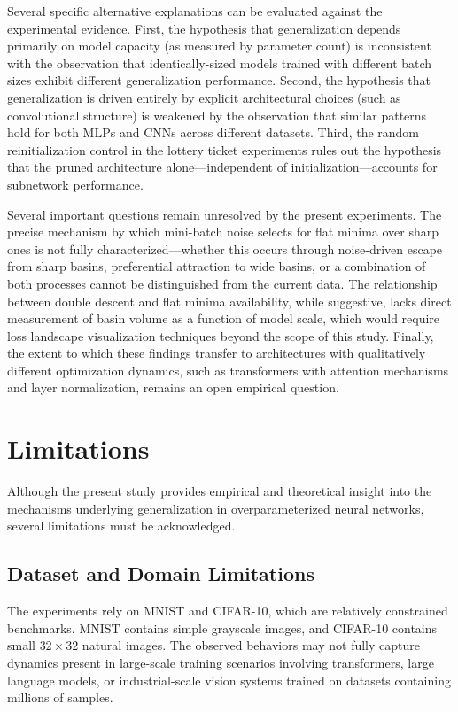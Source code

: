 \documentclass[conference]{IEEEtran}
\begin{document}
Several specific alternative explanations can be evaluated against the experimental evidence. First, the hypothesis that generalization depends primarily on model capacity (as measured by parameter count) is inconsistent with the observation that identically-sized models trained with different batch sizes exhibit different generalization performance. Second, the hypothesis that generalization is driven entirely by explicit architectural choices (such as convolutional structure) is weakened by the observation that similar patterns hold for both MLPs and CNNs across different datasets. Third, the random reinitialization control in the lottery ticket experiments rules out the hypothesis that the pruned architecture alone---independent of initialization---accounts for subnetwork performance.

Several important questions remain unresolved by the present experiments. The precise mechanism by which mini-batch noise selects for flat minima over sharp ones is not fully characterized---whether this occurs through noise-driven escape from sharp basins, preferential attraction to wide basins, or a combination of both processes cannot be distinguished from the current data. The relationship between double descent and flat minima availability, while suggestive, lacks direct measurement of basin volume as a function of model scale, which would require loss landscape visualization techniques beyond the scope of this study. Finally, the extent to which these findings transfer to architectures with qualitatively different optimization dynamics, such as transformers with attention mechanisms and layer normalization, remains an open empirical question.

\section{Limitations}

Although the present study provides empirical and theoretical insight into the mechanisms underlying generalization in overparameterized neural networks, several limitations must be acknowledged.

\subsection{Dataset and Domain Limitations}

The experiments rely on MNIST and CIFAR-10, which are relatively constrained benchmarks. MNIST contains simple grayscale images, and CIFAR-10 contains small $32 \times 32$ natural images. The observed behaviors may not fully capture dynamics present in large-scale training scenarios involving transformers, large language models, or industrial-scale vision systems trained on datasets containing millions of samples.
\end{document}
